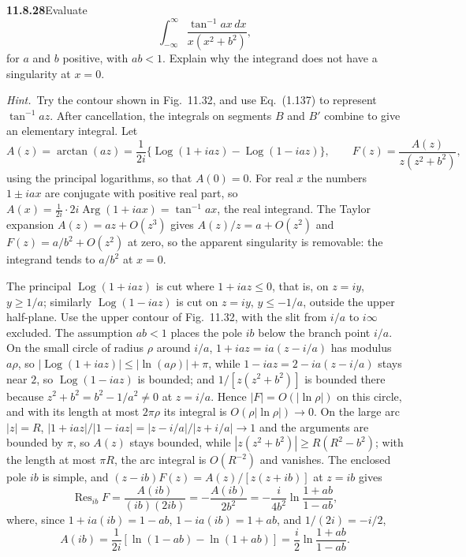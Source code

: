 \par\bigskip
\noindent\textbf{11.8.28}\quad Evaluate
\[
\int_{-\infty}^{\infty}\frac{\tan^{-1}ax\,dx}{x(x^{2}+b^{2})},
\]
for $a$ and $b$ positive, with $ab < 1$. Explain why the integrand does not
have a singularity at $x=0$.

\emph{Hint.}~Try the contour shown in Fig.~11.32, and use Eq.~(1.137) to
represent $\tan^{-1}az$. After cancellation, the integrals on segments $B$
and $B'$ combine to give an elementary integral.
\solution
Let
\[
A(z)=\arctan(az)
=\frac1{2i}\{\operatorname{Log}(1+iaz)
-\operatorname{Log}(1-iaz)\},\qquad
F(z)=\frac{A(z)}{z(z^2+b^2)},
\]
using the principal logarithms, so that $A(0)=0$. For real $x$ the
numbers $1\pm iax$ are conjugate with positive real part, so
$A(x)=\frac1{2i}\cdot2i\operatorname{Arg}(1+iax)=\tan^{-1}ax$, the
real integrand. The Taylor expansion $A(z)=az+O(z^3)$ gives
$A(z)/z=a+O(z^2)$ and $F(z)=a/b^2+O(z^2)$ at zero, so the apparent
singularity is removable: the integrand tends to $a/b^2$ at $x=0$.

The principal $\operatorname{Log}(1+iaz)$ is cut where $1+iaz\le0$,
that is, on $z=iy$, $y\ge1/a$; similarly $\operatorname{Log}(1-iaz)$
is cut on $z=iy$, $y\le-1/a$, outside the upper half-plane.
Use the upper contour of Fig.~11.32, with the slit from $i/a$ to
$i\infty$ excluded. The assumption $ab<1$ places the pole $ib$
below the branch point $i/a$. On the small circle of radius $\rho$
around $i/a$, $1+iaz=ia(z-i/a)$ has modulus $a\rho$, so
$|\operatorname{Log}(1+iaz)|\le|\ln(a\rho)|+\pi$, while
$1-iaz=2-ia(z-i/a)$ stays near $2$, so $\operatorname{Log}(1-iaz)$
is bounded; and $1/[z(z^2+b^2)]$ is bounded there because
$z^2+b^2=b^2-1/a^2\ne0$ at $z=i/a$. Hence $|F|=O(|\ln\rho|)$ on this
circle, and with its length at most $2\pi\rho$ its integral is
$O(\rho|\ln\rho|)\to0$. On the large
arc $|z|=R$, $|1+iaz|/|1-iaz|=|z-i/a|/|z+i/a|\to1$ and the arguments
are bounded by $\pi$, so $A(z)$ stays bounded, while
$|z(z^2+b^2)|\ge R(R^2-b^2)$; with the length at most $\pi R$, the
arc integral is $O(R^{-2})$ and vanishes. The enclosed pole $ib$ is
simple, and $(z-ib)F(z)=A(z)/[z(z+ib)]$ at $z=ib$ gives
\[
\operatorname{Res}_{ib}F
=\frac{A(ib)}{(ib)(2ib)}=-\frac{A(ib)}{2b^2}
=-\frac{i}{4b^2}\ln\frac{1+ab}{1-ab},
\]
where, since $1+ia(ib)=1-ab$, $1-ia(ib)=1+ab$, and $1/(2i)=-i/2$,
\[
A(ib)=\frac1{2i}\left[\ln(1-ab)-\ln(1+ab)\right]
=\frac i2\ln\frac{1+ab}{1-ab}.
\]

